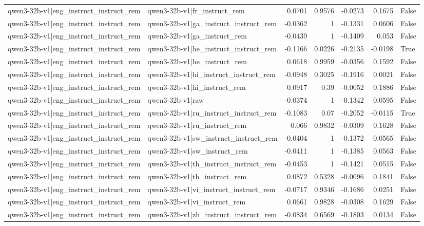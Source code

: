\begin{table}
\begin{tabular}{l l r r r r l}
qwen3-32b-v1|eng_instruct_instruct_rem & qwen3-32b-v1|fr_instruct_rem & 0.0701 & 0.9576 & -0.0273 & 0.1675 & False \\
qwen3-32b-v1|eng_instruct_instruct_rem & qwen3-32b-v1|ga_instruct_instruct_rem & -0.0362 & 1 & -0.1331 & 0.0606 & False \\
qwen3-32b-v1|eng_instruct_instruct_rem & qwen3-32b-v1|ga_instruct_rem & -0.0439 & 1 & -0.1409 & 0.053 & False \\
qwen3-32b-v1|eng_instruct_instruct_rem & qwen3-32b-v1|he_instruct_instruct_rem & -0.1166 & 0.0226 & -0.2135 & -0.0198 & True \\
qwen3-32b-v1|eng_instruct_instruct_rem & qwen3-32b-v1|he_instruct_rem & 0.0618 & 0.9959 & -0.0356 & 0.1592 & False \\
qwen3-32b-v1|eng_instruct_instruct_rem & qwen3-32b-v1|hi_instruct_instruct_rem & -0.0948 & 0.3025 & -0.1916 & 0.0021 & False \\
qwen3-32b-v1|eng_instruct_instruct_rem & qwen3-32b-v1|hi_instruct_rem & 0.0917 & 0.39 & -0.0052 & 0.1886 & False \\
qwen3-32b-v1|eng_instruct_instruct_rem & qwen3-32b-v1|raw & -0.0374 & 1 & -0.1342 & 0.0595 & False \\
qwen3-32b-v1|eng_instruct_instruct_rem & qwen3-32b-v1|ru_instruct_instruct_rem & -0.1083 & 0.07 & -0.2052 & -0.0115 & True \\
qwen3-32b-v1|eng_instruct_instruct_rem & qwen3-32b-v1|ru_instruct_rem & 0.066 & 0.9832 & -0.0309 & 0.1628 & False \\
qwen3-32b-v1|eng_instruct_instruct_rem & qwen3-32b-v1|sw_instruct_instruct_rem & -0.0404 & 1 & -0.1372 & 0.0565 & False \\
qwen3-32b-v1|eng_instruct_instruct_rem & qwen3-32b-v1|sw_instruct_rem & -0.0411 & 1 & -0.1385 & 0.0563 & False \\
qwen3-32b-v1|eng_instruct_instruct_rem & qwen3-32b-v1|th_instruct_instruct_rem & -0.0453 & 1 & -0.1421 & 0.0515 & False \\
qwen3-32b-v1|eng_instruct_instruct_rem & qwen3-32b-v1|th_instruct_rem & 0.0872 & 0.5328 & -0.0096 & 0.1841 & False \\
qwen3-32b-v1|eng_instruct_instruct_rem & qwen3-32b-v1|vi_instruct_instruct_rem & -0.0717 & 0.9346 & -0.1686 & 0.0251 & False \\
qwen3-32b-v1|eng_instruct_instruct_rem & qwen3-32b-v1|vi_instruct_rem & 0.0661 & 0.9828 & -0.0308 & 0.1629 & False \\
qwen3-32b-v1|eng_instruct_instruct_rem & qwen3-32b-v1|zh_instruct_instruct_rem & -0.0834 & 0.6569 & -0.1803 & 0.0134 & False \\

\end{tabular}
\end{table}
